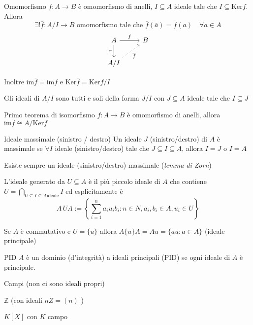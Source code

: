 \begin{theorem}{Omomorfismo}
    \(f : A\to B\) è omomorfismo di anelli, \(I \subseteq A \) ideale tale che
    \(I \subseteq \mathrm{Ker}f \). Allora
    \[
      \exists ! \overline{f} : A / I \to  B \text{ omomorfismo tale che } \overline{f}{(\overline{a})} = f{(a)} \quad \forall  a \in A
    \]
\[\begin{tikzcd}
	A & B \\
	{A / I}
	\arrow["f", from=1-1, to=1-2]
	\arrow["\pi"', from=1-1, to=2-1]
	\arrow["{\overline{f}}"', dotted, from=2-1, to=1-2]
\end{tikzcd}\]

Inoltre \(\mathrm{im}\overline{f} = \mathrm{im}f\) e \(\mathrm{Ker}\overline{f} = \mathrm{Ker} f / I\) 
\end{theorem}
\begin{proposition}{}
    Gli ideali di \(A / I\) sono tutti e soli della forma \(J / I\) con \(J \subseteq A \) ideale tale che \(I \subseteq J \) 
\end{proposition}


\begin{theorem}{Primo teorema di isomorfismo}
    \(f : A \to B\) è omomorfismo di anelli, allora \(\mathrm{im}f \cong A / \mathrm{Ker}f\)  
\end{theorem}

\begin{definition}{Ideale massimale (sinistro / destro)}
    Un ideale \(J\) (sinistro/destro) di \(A\) è massimale se \(\forall I\) ideale
    (sinistro/destro) tale che \(J \subseteq I \subseteq A  \), allora \(I = J\) o \( I = A\) 
\end{definition}
\begin{remark}{}
    Esiste sempre un ideale (sinistro/destro) massimale (\emph{lemma di Zorn})
\end{remark}

\begin{definition}{}
    L'ideale generato da \(U \subseteq A \) è il più piccolo ideale di \(A\) che
    contiene \(U = \bigcap_{U \subseteq I \subseteq A \text{ideale}} I \) ed
    esplicitamente è 
    \[
      A\,UA := \left\{\sum_{i=1}^{n} a_{i} u_{i} b_{i} : n \in N, a_{i}, b_{i} \in A, u_{i} \in U \right\} 
    \]
\end{definition}
\begin{remark}{}
    Se \(A\) è commutativo e \(U = \{u\} \) allora \(A \{ u \} A = Au = \{au : a
    \in A\} \) (ideale principale)
\end{remark}
\begin{definition}{PID}
    \(A\) è un dominio (d'integrità) a ideali principali (PID) se ogni ideale di
    \(A\) è principale.
\end{definition}
\begin{example}{}
    Campi (non ci sono ideali propri)
\end{example}
\begin{example}{}
    \(\mathbb{Z}\) (con ideali \(nZ = (n)\) )
\end{example}
\begin{example}{}
    \(K[X]\) con \(K\) campo
\end{example}
